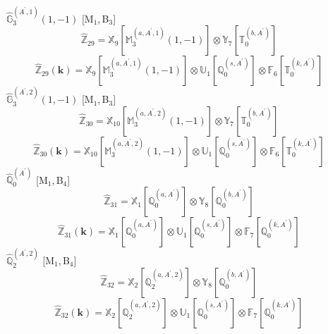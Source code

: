 \documentclass[fleqn,10pt,landscape]{article}
\begin{document}
\begin{itemize}
\begin{dmath*}
\end{dmath*}
\vspace{4mm}
\noindent {} $\,\,\,\hat{\mathbb{G}}_{3}^{(A^{\prime},1)}(1,-1)$ [M$_{1}$,\,B$_{3}$]
\begin{dmath*}
\hat{\mathbb{Z}}_{29}=\mathbb{X}_{9}[\mathbb{M}_{3}^{(a,A^{\prime},1)}(1,-1)] \otimes\mathbb{Y}_{7}[\mathbb{T}_{0}^{(b,A^{\prime})}]
\end{dmath*}
\begin{dmath*}
\hat{\mathbb{Z}}_{29}(\bm{k})=\mathbb{X}_{9}[\mathbb{M}_{3}^{(a,A^{\prime},1)}(1,-1)] \otimes\mathbb{U}_{1}[\mathbb{Q}_{0}^{(s,A^{\prime})}] \otimes\mathbb{F}_{6}[\mathbb{T}_{0}^{(k,A^{\prime})}]
\end{dmath*}
\vspace{4mm}
\noindent {} $\,\,\,\hat{\mathbb{G}}_{3}^{(A^{\prime},2)}(1,-1)$ [M$_{1}$,\,B$_{3}$]
\begin{dmath*}
\hat{\mathbb{Z}}_{30}=\mathbb{X}_{10}[\mathbb{M}_{3}^{(a,A^{\prime},2)}(1,-1)] \otimes\mathbb{Y}_{7}[\mathbb{T}_{0}^{(b,A^{\prime})}]
\end{dmath*}
\begin{dmath*}
\hat{\mathbb{Z}}_{30}(\bm{k})=\mathbb{X}_{10}[\mathbb{M}_{3}^{(a,A^{\prime},2)}(1,-1)] \otimes\mathbb{U}_{1}[\mathbb{Q}_{0}^{(s,A^{\prime})}] \otimes\mathbb{F}_{6}[\mathbb{T}_{0}^{(k,A^{\prime})}]
\end{dmath*}
\vspace{4mm}
\noindent {} $\,\,\,\hat{\mathbb{Q}}_{0}^{(A^{\prime})}$ [M$_{1}$,\,B$_{4}$]
\begin{dmath*}
\hat{\mathbb{Z}}_{31}=\mathbb{X}_{1}[\mathbb{Q}_{0}^{(a,A^{\prime})}] \otimes\mathbb{Y}_{8}[\mathbb{Q}_{0}^{(b,A^{\prime})}]
\end{dmath*}
\begin{dmath*}
\hat{\mathbb{Z}}_{31}(\bm{k})=\mathbb{X}_{1}[\mathbb{Q}_{0}^{(a,A^{\prime})}] \otimes\mathbb{U}_{1}[\mathbb{Q}_{0}^{(s,A^{\prime})}] \otimes\mathbb{F}_{7}[\mathbb{Q}_{0}^{(k,A^{\prime})}]
\end{dmath*}
\vspace{4mm}
\noindent {} $\,\,\,\hat{\mathbb{Q}}_{2}^{(A^{\prime},2)}$ [M$_{1}$,\,B$_{4}$]
\begin{dmath*}
\hat{\mathbb{Z}}_{32}=\mathbb{X}_{2}[\mathbb{Q}_{2}^{(a,A^{\prime},2)}] \otimes\mathbb{Y}_{8}[\mathbb{Q}_{0}^{(b,A^{\prime})}]
\end{dmath*}
\begin{dmath*}
\hat{\mathbb{Z}}_{32}(\bm{k})=\mathbb{X}_{2}[\mathbb{Q}_{2}^{(a,A^{\prime},2)}] \otimes\mathbb{U}_{1}[\mathbb{Q}_{0}^{(s,A^{\prime})}] \otimes\mathbb{F}_{7}[\mathbb{Q}_{0}^{(k,A^{\prime})}]

\end{dmath*}
\end{itemize}
\end{document}
